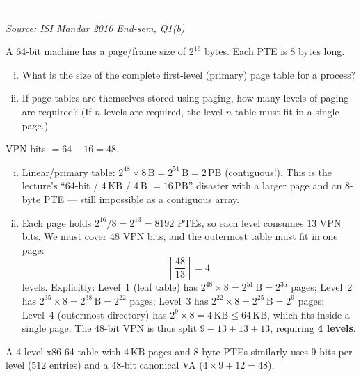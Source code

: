 \documentclass[11pt,a4paper]{article}
\makeatletter
\newcommand{\keepspace}[1]{\par\penalty-100\begingroup
  \setlength{\dimen@}{#1}\dimen@ii\pagegoal\advance\dimen@ii-\pagetotal
  \ifdim\dimen@>\dimen@ii\ifdim\dimen@ii>\z@\vfil\fi\break\fi\endgroup}
\newcounter{qn}[section]
\newenvironment{Qn}[4]{%
  \refstepcounter{qn}\keepspace{7\baselineskip}%
  \begin{tcolorbox}[qboxstyle, title={Q\thesection.\theqn\ \ [#1 \textbar\ #2]\ \ #4}]%
  {\footnotesize\color{g3}\textit{Source: #3}}\par\smallskip%
}{%
  \end{tcolorbox}%
}
\newenvironment{Sol}{%
  \begin{tcolorbox}[sboxstyle, title={Solution}]%
}{%
  \end{tcolorbox}\vspace{0.35em}%
}
\makeatother
\begin{document}
\begin{Qn}{Medium-Hard}{Lect 14}{ISI Mandar 2010 End-sem, Q1(b)}{64-bit linear table, and how many paging levels}
A 64-bit machine has a page/frame size of $2^{16}$ bytes. Each PTE is
8 bytes long.
\begin{enumerate}[(i)]
\item What is the size of the complete first-level (primary) page table
      for a process?
\item If page tables are themselves stored using paging, how many levels
      of paging are required? (If $n$ levels are required, the level-$n$
      table must fit in a single page.)
\end{enumerate}
\end{Qn}
\begin{Sol}
VPN bits $= 64-16 = 48$.
\begin{enumerate}[(i)]
\item Linear/primary table:
      $2^{48}\times 8\,\mathrm{B} = 2^{51}\,\mathrm{B} = 2\,\mathrm{PB}$
      (contiguous!). This is the lecture's ``64-bit / 4\,KB / 4\,B
      $= 16\,\mathrm{PB}$'' disaster with a larger page and an 8-byte
      PTE --- still impossible as a contiguous array.
\item Each page holds $2^{16}/8 = 2^{13} = 8192$ PTEs, so each level
      consumes 13 VPN bits. We must cover 48 VPN bits, and the outermost
      table must fit in one page:
      \[
      \left\lceil\frac{48}{13}\right\rceil = 4
      \]
      levels. Explicitly: Level~1 (leaf table) has $2^{48}\times 8 = 2^{51}\,\mathrm{B} = 2^{35}$ pages; Level~2 has $2^{35}\times 8 = 2^{38}\,\mathrm{B} = 2^{22}$ pages; Level~3 has $2^{22}\times 8 = 2^{25}\,\mathrm{B} = 2^{9}$ pages; Level~4 (outermost directory) has $2^{9}\times 8 = 4\,\mathrm{KB} \le 64\,\mathrm{KB}$, which fits inside a single page. The 48-bit VPN is thus split $9+13+13+13$, requiring \textbf{4 levels}.
\end{enumerate}
A 4-level x86-64 table with 4\,KB pages and 8-byte PTEs similarly uses
9 bits per level ($512$ entries) and a 48-bit canonical VA
($4\times 9 + 12 = 48$).
\end{Sol}
\end{document}
